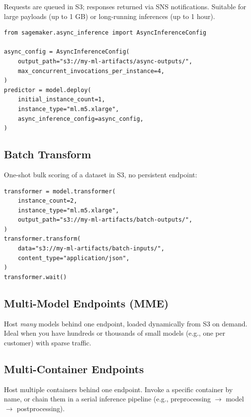 \documentclass[11pt,a4paper]{article}
\begin{document}
Requests are queued in S3; responses returned via SNS notifications. Suitable
for large payloads (up to 1 GB) or long-running inferences (up to 1 hour).

\begin{lstlisting}[style=pycode]
from sagemaker.async_inference import AsyncInferenceConfig

async_config = AsyncInferenceConfig(
    output_path="s3://my-ml-artifacts/async-outputs/",
    max_concurrent_invocations_per_instance=4,
)
predictor = model.deploy(
    initial_instance_count=1,
    instance_type="ml.m5.xlarge",
    async_inference_config=async_config,
)
\end{lstlisting}

\subsection{Batch Transform}

One-shot bulk scoring of a dataset in S3, no persistent endpoint:

\begin{lstlisting}[style=pycode]
transformer = model.transformer(
    instance_count=2,
    instance_type="ml.m5.xlarge",
    output_path="s3://my-ml-artifacts/batch-outputs/",
)
transformer.transform(
    data="s3://my-ml-artifacts/batch-inputs/",
    content_type="application/json",
)
transformer.wait()
\end{lstlisting}

\subsection{Multi-Model Endpoints (MME)}

Host \emph{many} models behind one endpoint, loaded dynamically from S3 on
demand. Ideal when you have hundreds or thousands of small models (e.g., one
per customer) with sparse traffic.

\subsection{Multi-Container Endpoints}

Host multiple containers behind one endpoint. Invoke a specific container by
name, or chain them in a serial inference pipeline (e.g., preprocessing
$\rightarrow$ model $\rightarrow$ postprocessing).
\end{document}
